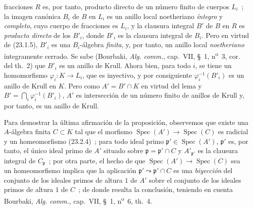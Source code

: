 fracciones $R$ es, por tanto, producto directo de un número finito de cuerpos $L_i$~;
la imagen canónica $B_i$ de $B$ en $L_i$ es un anillo local noetheriano
\emph{íntegro} y \emph{completo}, cuyo cuerpo de fracciones es $L_i$, y la
clausura integral $B'$ de $B$ en $R$ es \emph{producto directo} de los
$B'_i$, donde $B'_i$ es la clausura integral de $B_i$. Pero en virtud de
(23.1.5), $B'_i$ es una $B_i$-álgebra \emph{finita}, y, por tanto, un anillo local
\emph{noetheriano} íntegramente cerrado. Se sabe (Bourbaki,
\emph{Alg. comm.}, cap.~VII, §~1, n\textsuperscript{o}~3, cor. del th.~2) que
$B'_i$ es un anillo de Krull. Ahora bien, para todo $i$, se tiene un homomorfismo
$\varphi_i:K\to L_i$, que es inyectivo, y por consiguiente
$\varphi_i^{-1}(B'_i)$ es un anillo de Krull en $K$. Pero como
$A'=B'\cap K$ en virtud del lema y
$B'=\bigcap_i\varphi_i^{-1}(B'_i)$, $A'$ es intersección de un número finito
de anillos de Krull y, por tanto, es un anillo de Krull.

Para demostrar la última afirmación de la proposición, observemos que existe una
$A$-álgebra finita $C\subset K$ tal que el morfismo
$\operatorname{Spec}(A')\to\operatorname{Spec}(C)$ es radicial y un
homeomorfismo (23.2.4)~; para todo ideal primo
$\mathfrak p'\in\operatorname{Spec}(A')$, $\mathfrak p'$ es, por tanto, el único
ideal primo de $A'$ situado sobre $\mathfrak p=\mathfrak p'\cap C$ y
$A'_{\mathfrak p'}$ es la clausura integral de $C_{\mathfrak p}$~; por otra parte,
el hecho de que $\operatorname{Spec}(A')\to\operatorname{Spec}(C)$ sea un
homeomorfismo implica que la aplicación
$\mathfrak p'\leadsto\mathfrak p'\cap C$ es una \emph{biyección} del conjunto de los
ideales primos de altura $1$ de $A'$ sobre el conjunto de los ideales primos de
altura $1$ de $C$~; de donde resulta la conclusión, teniendo en cuenta Bourbaki,
\emph{Alg. comm.}, cap.~VII, §~1, n\textsuperscript{o}~6, th.~4.

